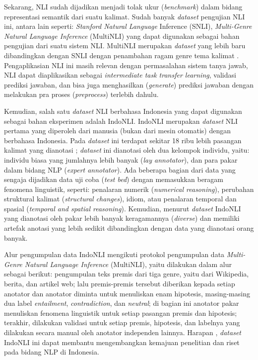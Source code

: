 Sekarang, NLI sudah dijadikan menjadi tolak ukur (\emph{benchmark}) dalam bidang representasi semantik dari suatu kalimat. Sudah banyak \emph{dataset} pengujian NLI ini, antara lain seperti: \emph{Stanford Natural Language} Inference (SNLI), \emph{Multi-Genre Natural Language Inference} (MultiNLI) yang dapat digunakan sebagai bahan pengujian dari suatu sistem NLI. MultiNLI merupakan \emph{dataset} yang lebih baru dibandingkan dengan SNLI dengan penambahan ragam genre tema kalimat \citep{williams-etal-2018-broad}. Pengaplikasian NLI ini masih relevan dengan permasalahan sistem tanya jawab, NLI dapat diaplikasikan sebagai \emph{intermediate task transfer learning}, validasi prediksi jawaban, dan bisa juga menghasilkan (\emph{generate}) prediksi jawaban dengan melakukan pra proses (\emph{preprocess}) terlebih dahulu.

Kemudian, salah satu \emph{dataset} NLI berbahasa Indonesia yang dapat digunakan sebagai bahan eksperimen adalah IndoNLI. IndoNLI merupakan \emph{dataset} NLI pertama yang diperoleh dari manusia (bukan dari mesin otomatis) dengan berbahasa Indonesia. Pada \emph{dataset} ini terdapat sekitar 18 ribu lebih pasangan kalimat yang dianotasi \citep{mahendra-etal-2021-indonli}; \emph{dataset} ini dianotasi oleh dua kelompok individu, yaitu: individu biasa yang jumlahnya lebih banyak (\emph{lay annotator}), dan para pakar dalam bidang NLP (\emph{expert annotator}). Ada beberapa bagian dari data yang sengaja dijadikan data uji coba (\emph{test bed}) dengan memasukkan beragam fenomena linguistik, seperti: penalaran numerik (\emph{numerical reasoning}), perubahan struktural kalimat (\emph{structural changes}), idiom, atau penalaran temporal dan spasial (\emph{temporal and spatial reasoning}). Kemudian, menurut \citet{mahendra-etal-2021-indonli} \emph{dataset} IndoNLI yang dianotasi oleh pakar lebih banyak keragamannya (\emph{diverse}) dan memiliki artefak anotasi yang lebih sedikit dibandingkan dengan data yang dianotasi orang banyak.

Alur pengumpulan data IndoNLI mengikuti protokol pengumpulan data \emph{Multi-Genre Natural Language Inference} (MultiNLI), yaitu dilakukan dalam alur sebagai berikut: pengumpulan teks premis dari tiga genre, yaitu dari Wikipedia, berita, dan artikel web; lalu premis-premis tersebut diberikan kepada setiap anotator dan anotator diminta untuk menuliskan enam hipotesis, masing-masing dua label \emph{entailment}, \emph{contradiction}, dan \emph{neutral}; di bagian ini anotator pakar menuliskan fenomena linguistik untuk setiap pasangan premis dan hipotesis; terakhir, dilakukan validasi untuk setiap premis, hipotesis, dan labelnya yang dilakukan secara manual oleh anotator independen lainnya. Harapan \citet{mahendra-etal-2021-indonli}, \emph{dataset} IndoNLI ini dapat membantu mengembangkan kemajuan penelitian dan riset pada bidang NLP di Indonesia.

